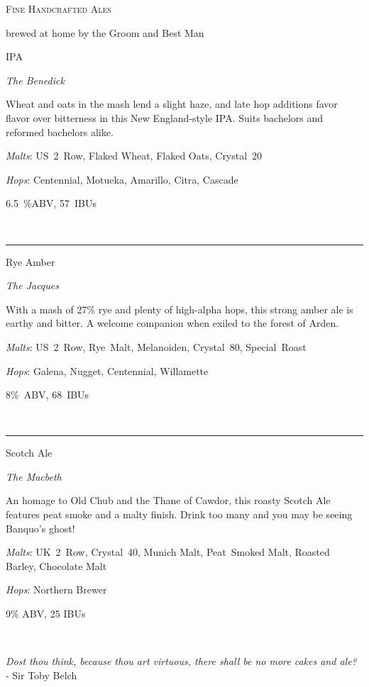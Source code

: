 \documentclass[12pt]{article}
\newcommand{\setbrew}[6]{
\begin{minipage}[t]{0.30\textwidth}
\begin{center}
  {\huge #1}

  \medskip
  
  {\Large \textit{#2}}

\medskip
  
{\large #3

  \medskip

  \textit{Malts}: #4
  
  \smallskip
  
  \textit{Hops}: #5
  
  \medskip
  
  #6
}\ 
\end{center}
\end{minipage}
}
\newcommand{\brewrule}{
  \hspace*{\fill} \rule[-9.5cm]{1pt}{10cm} \hspace*{\fill}
}
\begin{document}
\begin{center}

{\Huge \scshape Fine Handcrafted Ales }

\bigskip

{\Large brewed at home by the Groom and Best Man}

\vspace*{\fill}

\setbrew{IPA}
{The Benedick}
{
Wheat and oats in
the mash lend a slight haze, and late hop additions favor flavor over
bitterness in this New England-style IPA.
Suits bachelors and reformed bachelors alike.
}
{US~2~Row, Flaked Wheat, Flaked Oats, Crystal~20}
{Centennial, Motueka, Amarillo, Citra, Cascade}
{6.5~\%ABV, 57~IBUs}
%
\brewrule
\setbrew{Rye Amber}{The Jacques}
{
  With a mash of 27\% rye and plenty of high-alpha hops, this strong
  amber ale is earthy and bitter.
  A welcome companion when exiled to the forest of Arden.
}
{ US~2~Row, Rye~Malt, Melanoiden, Crystal~80, Special~Roast }
{ Galena, Nugget, Centennial, Willamette }
{ 8\%~ABV, 68~IBUs }
%
\brewrule
\setbrew{Scotch Ale}{The Macbeth}
{
  An homage to Old Chub and the Thane of Cawdor, this roasty 
  Scotch Ale features peat smoke and a malty finish.
  Drink too many and you may be seeing Banquo's ghost!
}
{ UK~2~Row, Crystal~40, Munich Malt, Peat~Smoked Malt, Roasted
  Barley, Chocolate Malt
}
{ Northern Brewer }
{ 9\% ABV, 25 IBUs }

\vspace*{\fill}

{\large
\textit{Dost thou think, because thou art 
  virtuous, there shall be no more cakes and ale?} \\
- Sir Toby Belch
}


\end{center}
\end{document}
